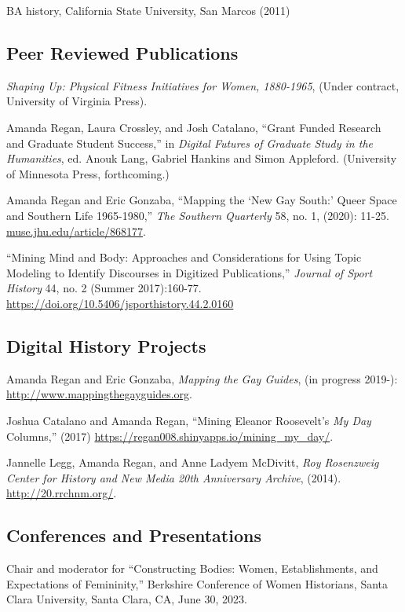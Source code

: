\documentclass[11pt]{article}
\begin{document}
BA history, California State University, San Marcos (2011)


\subsection{Peer Reviewed Publications}\label{peer-reviewed}

\emph{Shaping Up: Physical Fitness Initiatives for Women, 1880-1965}, (Under contract, University of Virginia Press).

Amanda Regan, Laura Crossley, and Josh Catalano, ``Grant Funded Research and Graduate Student Success,'' in \emph{Digital Futures of Graduate Study in the Humanities}, ed. Anouk Lang, Gabriel Hankins and Simon Appleford. (University of Minnesota Press, forthcoming.)

Amanda Regan and Eric Gonzaba, ``Mapping the `New Gay South:' Queer Space and Southern Life 1965-1980,'' \emph{The Southern Quarterly} 58, no. 1, (2020): 11-25. \url{muse.jhu.edu/article/868177}.

``Mining Mind and Body: Approaches and Considerations for Using Topic Modeling to Identify Discourses in Digitized Publications,'' \emph{Journal of Sport History} 44, no. 2 (Summer 2017):160-77. \url{https://doi.org/10.5406/jsporthistory.44.2.0160}

\subsection{Digital History Projects}
Amanda Regan and Eric Gonzaba, \emph{Mapping the Gay Guides}, (in progress 2019-): \url{http://www.mappingthegayguides.org}.

Joshua Catalano and Amanda Regan, ``Mining Eleanor Roosevelt's \emph{My Day} Columns,'' (2017) \url{https://regan008.shinyapps.io/mining_my_day/}.

Jannelle Legg, Amanda Regan, and Anne Ladyem McDivitt, \emph{Roy Rosenzweig Center for History and New Media 20th Anniversary Archive}, (2014). \url{http://20.rrchnm.org/}.

\subsection{Conferences and Presentations}

Chair and moderator for ``Constructing Bodies: Women, Establishments, and Expectations of Femininity,'' Berkshire Conference of Women Historians, Santa Clara University, Santa Clara, CA, June 30, 2023.
\end{document}
